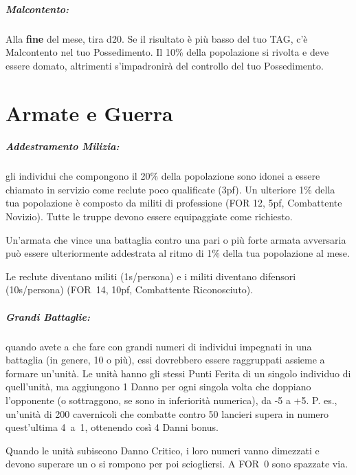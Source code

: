 \documentclass[itdr]{subfiles}
\begin{document}
\subparagraph{Malcontento:} Alla \textbf{fine} del mese, tira d20. Se il risultato è più basso del tuo TAG, c’è Malcontento nel tuo Possedimento. Il 10\% della popolazione si rivolta e deve essere domato, altrimenti s’impadronirà del controllo del tuo Possedimento. 

\section{Armate e Guerra}


\subparagraph{Addestramento Milizia:} gli individui che compongono il 20\% della popolazione sono idonei a essere chiamato in servizio come reclute poco qualificate (3pf). Un ulteriore 1\% della tua popolazione è composto da militi di professione (FOR 12, 5pf, Combattente Novizio). Tutte le truppe devono essere equipaggiate come richiesto.

Un’armata che vince una battaglia contro una pari o più forte armata avversaria può essere ulteriormente addestrata al ritmo di 1\% della tua popolazione al mese. 

Le reclute diventano militi (1s/persona) e i \mbox{militi} diventano difensori (10s/persona) (FOR~14, 10pf, Combattente Riconosciuto).

\break

\subparagraph{Grandi Battaglie:} quando avete a che fare con grandi numeri di individui impegnati in una battaglia (in genere, 10 o più), essi dovrebbero essere raggruppati assieme a formare un’unità. Le unità hanno gli stessi Punti Ferita di un singolo individuo di quell’unità, ma aggiungono 1 Danno per ogni singola volta che doppiano l’opponente (o sottraggono, se sono in inferiorità numerica), da -5 a +5. P. es., un’unità di 200 cavernicoli che combatte contro 50 lancieri supera in numero quest’ultima \mbox{4 a 1}, ottenendo così 4 Danni bonus.

Quando le unità subiscono Danno Critico, i loro numeri vanno dimezzati e devono superare un  o si rompono per poi sciogliersi. A FOR~0 sono spazzate via.
\end{document}
